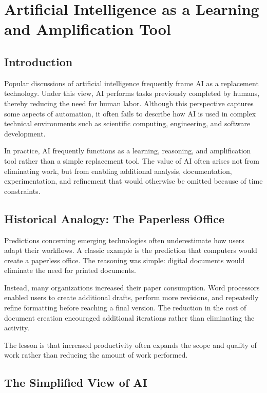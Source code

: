 \documentclass[11pt]{article}
\begin{document}
\section{Artificial Intelligence as a Learning and Amplification Tool}

\subsection{Introduction}

Popular discussions of artificial intelligence frequently frame AI as a
replacement technology. Under this view, AI performs tasks previously
completed by humans, thereby reducing the need for human labor.
Although this perspective captures some aspects of automation, it often
fails to describe how AI is used in complex technical environments such
as scientific computing, engineering, and software development.

In practice, AI frequently functions as a learning, reasoning, and
amplification tool rather than a simple replacement tool. The value of
AI often arises not from eliminating work, but from enabling additional
analysis, documentation, experimentation, and refinement that would
otherwise be omitted because of time constraints.

\subsection{Historical Analogy: The Paperless Office}

Predictions concerning emerging technologies often underestimate how
users adapt their workflows. A classic example is the prediction that
computers would create a paperless office. The reasoning was simple:
digital documents would eliminate the need for printed documents.

Instead, many organizations increased their paper consumption. Word
processors enabled users to create additional drafts, perform more
revisions, and repeatedly refine formatting before reaching a final
version. The reduction in the cost of document creation encouraged
additional iterations rather than eliminating the activity.

The lesson is that increased productivity often expands the scope and
quality of work rather than reducing the amount of work performed.

\subsection{The Simplified View of AI}
\end{document}
